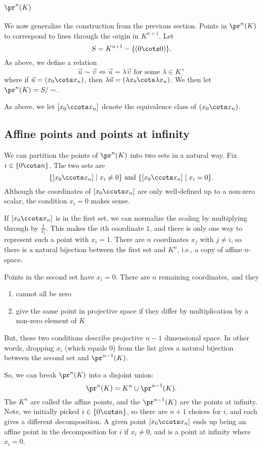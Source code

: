 \documentclass[12pt]{amsart}
\theoremstyle{plain}
\theoremstyle{definition}
\theoremstyle{remark}
\begin{document}
\subsection{$\pr^n(K)$}
We now generalize the construction from the previous section.  
Points in $\pr^n(K)$ to correspond to lines through the origin in
$K^{n+1}$.  Let
\[ S= K^{n+1}-\{(0\cots 0)\}.\]
As above, we define a relation 
\[ \vec u\sim \vec v \iff \vec u=\lambda\vec v \text{ for some $\lambda\in 
K^\times$}\]
where if $\vec u=(x_0\cots x_n)$, then $\lambda\vec u = (\lambda x_0\cots
\lambda x_n)$.
We then let $\pr^n(K)=S/\sim$.

As above, we let $[x_0\ccots x_n]$ denote the equivalence class of
$(x_0\cots x_n)$.

\subsection{Affine points and points at infinity}
We can partition the points of $\pr^n(K)$ into two sets in a
natural way.  Fix $i\in\{0\cots n\}$.  The two sets are
\[ \{[x_0\ccots x_n] \mid x_i\neq 0\} \text{ and } 
\{[x_0\ccots x_n] \mid x_i = 0\}. \]
Although the coordinates of $[x_0\ccots x_n]$ are only well-defined
up to a non-zero scalar, the condition $x_i=0$ makes sense.

If $[x_0\ccots x_n]$ is in the first set, we can normalize the
scaling by multiplying through by $\frac1{x_i}$.  This makes the
$i$th coordinate $1$, and there is only one way to represent such
a point with $x_i=1$.  There are $n$ coordinates $x_j$ with $j\neq i$,
so there is a natural bijection between the first set and $K^n$, i.e.,
a copy of affine $n$-space.

Points in the second set have $x_i=0$.  There are $n$ remaining coordinates,
and they
\begin{enumerate}
\item cannot all be zero
\item give the same point in projective space if they differ by
multiplication by a non-zero element of $K$
\end{enumerate}
But, these two conditions describe projective $n-1$ dimensional space.
In other words, dropping $x_i$ (which equals $0$) from the list gives
a natural bijection between the second set and $\pr^{n-1}(K)$.

So, we can break $\pr^n(K)$ into a disjoint union:
\[ \pr^n(K) = K^n \cup \pr^{n-1}(K). \]
The $K^n$ are called the affine points, and the $\pr^{n-1}(K)$ are
the points at infinity.  Note, we initially picked $i\in\{0\cots n\}$,
so there are $n+1$ choices for $i$, and each gives a different decomposition.
A given point $[x_0\ccots x_n]$ ends up being an affine point in the 
decomposition for $i$ if $x_i\neq 0$, and is a point at infinity where
$x_i=0$.
\end{document}

